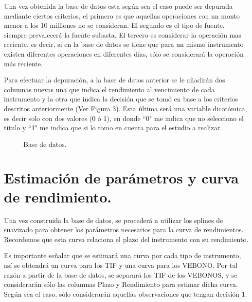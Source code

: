 \hspace{0.4cm} Una vez obtenida la base de datos esta seg\'un sea el caso puede ser depurada mediante ciertos criterios, el primero es que aquellas operaciones con un monto menor a los 10 milllones no se consideran. El segundo es el tipo de fuente, siempre prevalecer\'a la fuente subasta. El tercero es considerar la operaci\'on mas reciente, es decir, si en la base de datos se tiene que para un mismo instrumento existen diferentes operaciones en diferentes d\'ias, s\'olo se considerar\'a la operaci\'on m\'as reciente.

\vspace{0.5cm}

\hspace{0.4cm} Para efectuar la depuraci\'on, a la base de datos anterior se le a\~nadir\'an dos columnas nuevas una que indica el rendimiento al vencimiento de cada instrumento y la otra que indica la decisi\'on que se tom\'o en base a los criterios descritos anteriormente (Ver Figura 3). Esta \'ultima ser\'a una variable dicot\'omica, es decir solo con dos valores (0 \'o 1), en donde ``0" me indica que no selecciono el t\'itulo y ``1" me indica que si lo tomo en cuenta para el estudio a realizar.\\

\begin{figure}[h]
\caption{Base de datos.}
\end{figure}


\section{Estimaci\'on de par\'ametros y curva de rendimiento.}

\hspace{0.4cm} Una vez construida la base de datos, se proceder\'a a utilizar los splines de suavizado para obtener los par\'ametros necesarios para la curva de rendimientos. Recordemos que esta curva relaciona el plazo del instrumento con su rendimiento.

\vspace{0.5cm}

\hspace{0.4cm} Es importante se\~nalar que se estimar\'a una curva por cada tipo de instrumento, as\'i se obtendr\'a un curva para los TIF y una curva para los VEBONO. Por tal raz\'on a partir de la base de datos, se separar\'a los TIF de los VEBONOS, y se considerar\'an s\'olo las columnas Plazo y Rendimiento para estimar dicha curva. Seg\'un sea el caso, s\'olo considerar\'an aquellas observaciones que tengan decisi\'on 1.


